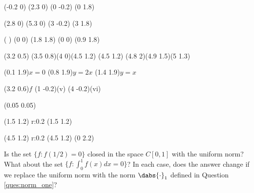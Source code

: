 \begin{solution}[\bf Solution.]
{\move (-0.2 0) \avec(2.3 0)
\move (0 -0.2) \avec(0 1.8)

\move (2.8 0) \avec(5.3 0)
\move (3 -0.2) \avec(3 1.8)

\lpatt( )
\move (0 0) \lvec (1.8 1.8)
\move (0 0) \lvec (0.9 1.8)

\move (3.2 0.5) \clvec (3.5 0.8)(4 0)(4.5 1.2)
\move (4.5 1.2) \clvec (4.8 2)(4.9 1.5)(5 1.3)

\htext (0.1 1.9){$x=0$}
\htext (0.8 1.9){$y = 2x$}
\htext (1.4 1.9){$y = x$}


\htext (3.2 0.6){$f$}
\htext (1 -0.2){(v)}
\htext (4 -0.2){(vi)}

\lpatt(0.05 0.05)

\move (1.5 1.2) \lcir r:0.2
\move (1.5 1.2) \bdot

\move (4.5 1.2) \lcir r:0.2
\move (4.5 1.2) \bdot
\move (0 2.2)
}

\een



\end{solution}

\begin{problem}Is the set $\{f : f(1/2) = 0\}$ closed in the space $C[0, 1]$ with the uniform norm? What about the set $\{f : \int^1_0 f(x)dx = 0\}$? In each case, does the answer change if we replace the uniform norm with the norm $\dabs{\cdot}_1$ defined in Question \ref{ques:norm_one}?



\end{problem}

